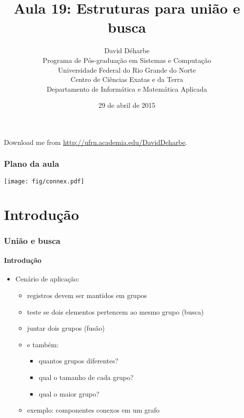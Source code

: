 \documentclass{beamer}
\title{Aula 19: Estruturas para união e busca}
\author{David Déharbe \\
  Programa de Pós-graduação em Sistemas e Computação \\
  Universidade Federal do Rio Grande do Norte \\
  Centro de Ciências Exatas e da Terra \\
  Departamento de Informática e Matemática Aplicada}
\date{29 de abril de 2015}
\begin{document}
\begin{frame}
  \titlepage
  Download me from \url{http://ufrn.academia.edu/DavidDeharbe}.
\end{frame}

\begin{frame}
  \frametitle{Plano da aula}

\begin{center}
  \texttt{[image: fig/connex.pdf]}
\end{center}

  \tableofcontents

\end{frame}

\section{Introdução}

\begin{frame}

  \frametitle{União e busca}
  \framesubtitle{Introdução}

  
  \begin{itemize}
    
  \item Cenário de aplicação:

    \begin{itemize}

      \item registros devem ser mantidos em grupos

      \item teste se dois elementos pertencem ao mesmo grupo (\alert{busca})

      \item juntar dois grupos (\alert{fusão})

      \item e também: 

        \begin{itemize}

          \item quantos grupos diferentes? 

          \item qual o tamanho de cada grupo?

          \item qual o maior grupo? 

        \end{itemize}

      \item exemplo: componentes conexos em um grafo

    \end{itemize}

\end{itemize}

\end{frame}
\end{document}
